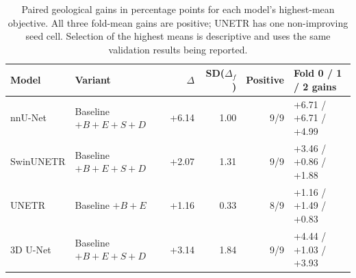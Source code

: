 \documentclass[12pt,a4paper]{article}
\begin{document}
\FloatBarrier
\begin{table}[htbp]
\centering\footnotesize{}
\setlength{\tabcolsep}{5pt}
\begin{tabular}{@{}llrrrl@{}}
\hline
Model & Variant & $\Delta$ & SD($\Delta_f$) & Positive & Fold 0 / 1 / 2 gains \\
\hline
nnU-Net & Baseline $+B+E+S+D$ & +6.14 & 1.00 & 9/9 & +6.71 / +6.71 / +4.99 \\
SwinUNETR & Baseline $+B+E+S+D$ & +2.07 & 1.31 & 9/9 & +3.46 / +0.86 / +1.88 \\
UNETR & Baseline $+B+E$ & +1.16 & 0.33 & 8/9 & +1.16 / +1.49 / +0.83 \\
3D U-Net & Baseline $+B+E+S+D$ & +3.14 & 1.84 & 9/9 & +4.44 / +1.03 / +3.93 \\
\hline
\end{tabular}
\caption{Paired geological gains in percentage points for each model's
highest-mean objective. All three fold-mean gains are positive; UNETR
has one non-improving seed cell. Selection of the highest means is
descriptive and uses the same validation results being reported.}
\label{tab:geo-best}
\end{table}
\FloatBarrier
\end{document}
